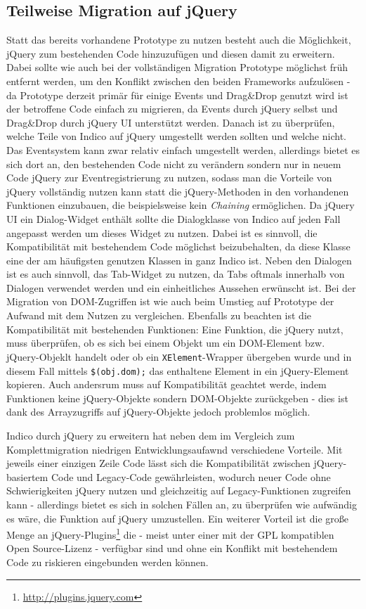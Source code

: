\subsection{Teilweise Migration auf jQuery}
Statt das bereits vorhandene Prototype zu nutzen besteht auch die Möglichkeit, jQuery zum
bestehenden Code hinzuzufügen und diesen damit zu erweitern. Dabei sollte wie auch bei der
vollständigen Migration Prototype möglichst früh entfernt werden, um den Konflikt zwischen den
beiden Frameworks aufzulösen - da Prototype derzeit primär für einige Events und Drag\&Drop genutzt
wird ist der betroffene Code einfach zu migrieren, da Events durch jQuery selbst und Drag\&Drop
durch jQuery UI unterstützt werden. Danach ist zu überprüfen, welche Teile von Indico auf jQuery
umgestellt werden sollten und welche nicht. Das Eventsystem kann zwar relativ einfach umgestellt
werden, allerdings bietet es sich dort an, den bestehenden Code nicht zu verändern sondern nur in
neuem Code jQuery zur Eventregistrierung zu nutzen, sodass man die Vorteile von jQuery vollständig
nutzen kann statt die jQuery-Methoden in den vorhandenen Funktionen einzubauen, die beispielsweise
kein \emph{Chaining} ermöglichen. Da jQuery UI ein Dialog-Widget enthält sollte die Dialogklasse von
Indico auf jeden Fall angepasst werden um dieses Widget zu nutzen. Dabei ist es sinnvoll, die
Kompatibilität mit bestehendem Code möglichst beizubehalten, da diese Klasse eine der am häufigsten
genutzen Klassen in ganz Indico ist. Neben den Dialogen ist es auch sinnvoll, das Tab-Widget zu
nutzen, da Tabs oftmals innerhalb von Dialogen verwendet werden und ein einheitliches Aussehen
erwünscht ist. Bei der Migration von DOM-Zugriffen ist wie auch beim Umstieg auf Prototype der
Aufwand mit dem Nutzen zu vergleichen. Ebenfalls zu beachten ist die Kompatibilität mit bestehenden
Funktionen: Eine Funktion, die jQuery nutzt, muss überprüfen, ob es sich bei einem Objekt um ein
DOM-Element bzw. jQuery-Objeklt handelt oder ob ein \lstinline{XElement}-Wrapper übergeben wurde und
in diesem Fall mittels \lstinline{$(obj.dom);} das enthaltene Element in ein jQuery-Element
kopieren. Auch andersrum muss auf Kompatibilität geachtet werde, indem Funktionen keine
jQuery-Objekte sondern DOM-Objekte zurückgeben - dies ist dank des Arrayzugriffs auf jQuery-Objekte
jedoch problemlos möglich.

Indico durch jQuery zu erweitern hat neben dem im Vergleich zum Komplettmigration niedrigen
Entwicklungsaufawnd verschiedene Vorteile. Mit jeweils einer einzigen Zeile Code lässt sich die
Kompatibilität zwischen jQuery-basiertem Code und Legacy-Code gewährleisten, wodurch neuer Code ohne
Schwierigkeiten jQuery nutzen und gleichzeitig auf Legacy-Funktionen zugreifen kann - allerdings
bietet es sich in solchen Fällen an, zu überprüfen wie aufwändig es wäre, die Funktion auf jQuery
umzustellen. Ein weiterer Vorteil ist die große Menge an
jQuery-Plugins\footnote{\href{http://plugins.jquery.com}{http://plugins.jquery.com}} die - meist
unter einer mit der GPL kompatiblen Open Source-Lizenz - verfügbar sind und ohne ein Konflikt mit
bestehendem Code zu riskieren eingebunden werden können.



